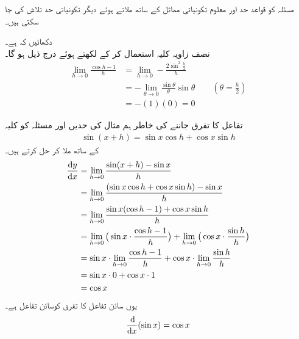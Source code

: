مسئلہ  کو قواعد حد اور معلوم تکونیاتی مماثل کے ساتھ ملاتے ہوئے دیگر تکونیاتی حد تلاش کی جا سکتی  ہیں۔ 

دکھائیں کہ  ہے۔\\
نصف زاویہ کلیہ استعمال کر کے   لکھتے ہوئے درج ذیل ہو گا۔
\begin{align*}
\lim_{h\to 0}\frac{\cos h-1}{h}&=\lim_{h\to 0}-\frac{2\sin^2\tfrac{h}{2}}{h}\\
&=-\lim_{\theta\to 0} \frac{\sin\theta}{\theta}\sin\theta\quad\quad (\theta=\frac{h}{2})\\
&=-(1)(0)=0
\end{align*}


تفاعل  کا تفرق جاننے کی خاطر ہم مثال  کی  حدیں  اور  مسئلہ  کو  کلیہ 
\begin{align*}
\sin(x+h)=\sin x\cos h+\cos x\sin h
\end{align*}
کے ساتھ ملا کر حل کرتے ہیں۔
\begin{align*}
\frac{\dif y}{\dif x}&=\lim_{h\to 0}\frac{\sin(x+h)-\sin x}{h}\\
&=\lim_{h\to 0} \frac{(\sin x\cos h+\cos x\sin h)-\sin x}{h}\\
&=\lim_{h\to 0} \frac{\sin x(\cos h-1)+\cos x\sin h}{h}\\
&=\lim_{h\to 0} \big(\sin x\cdot \frac{\cos h-1}{h}\big)+\lim_{h\to 0}\big(\cos x\cdot \frac{\sin h}{h}\big)\\
&=\sin x\cdot \lim_{h\to 0}\frac{\cos h-1}{h}+\cos x\cdot \lim_{h\to 0}\frac{\sin h}{h}\\
&=\sin x\cdot 0+\cos x \cdot 1\\
&=\cos x
\end{align*}
یوں سائن تفاعل کا تفرق کوسائن تفاعل ہے۔
\begin{align*}
\frac{\dif}{\dif x} (\sin x)=\cos x
\end{align*}

